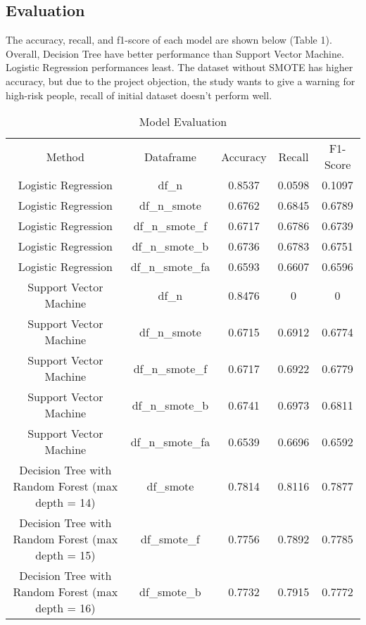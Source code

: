 \documentclass[11pt]{article}
\begin{document}
\subsection{Evaluation}
\text The accuracy, recall, and f1-score of each model are shown below (Table 1). \\
Overall, Decision Tree have better performance than Support Vector Machine. Logistic Regression performances least. The dataset without SMOTE has higher accuracy, but due to the project objection, the study wants to give a warning for high-risk people, recall of initial dataset doesn't perform well.  
\begin{table}[h]
    \centering
    \begin{tabular}{ccccc}
        Method & Dataframe  & Accuracy & Recall & F1-Score \\
        Logistic Regression & df\_n & 0.8537 & 0.0598 & 0.1097\\
        Logistic Regression & df\_n\_smote & 0.6762 & 0.6845 &0.6789 \\
        Logistic Regression & df\_n\_smote\_f & 0.6717 & 0.6786 &0.6739 \\
        Logistic Regression & df\_n\_smote\_b & 0.6736 & 0.6783 &0.6751 \\
        Logistic Regression & df\_n\_smote\_fa & 0.6593 & 0.6607 & 0.6596\\
        Support Vector Machine & df\_n& 0.8476& 0 & 0\\
        Support Vector Machine & df\_n\_smote & 0.6715 & 0.6912 & 0.6774 \\
        Support Vector Machine & df\_n\_smote\_f & 0.6717 & 0.6922 & 0.6779\\
        Support Vector Machine & df\_n\_smote\_b & 0.6741 & 0.6973 & 0.6811\\
        Support Vector Machine & df\_n\_smote\_fa & 0.6539 & 0.6696 & 0.6592\\
        Decision Tree with Random Forest (max depth = 14)& df\_smote & 0.7814 & 0.8116 & 0.7877\\
        Decision Tree with Random Forest (max depth = 15)& df\_smote\_f & 0.7756 & 0.7892 & 0.7785\\
        Decision Tree with Random Forest (max depth = 16)& df\_smote\_b & 0.7732 & 0.7915 & 0.7772\\
    \end{tabular}
    \caption{Model Evaluation}
    \label{tab:my_label}
\end{table}
\end{document}
